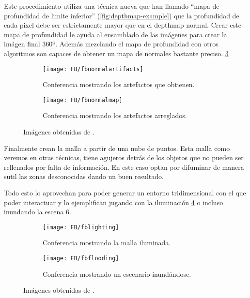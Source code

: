 Este procedimiento utiliza una técnica nueva que han llamado ``mapa de profundidad de limite inferior'' (\ref{fig:depthmap-example}) que la profundidad de cada pixel debe ser estrictamente mayor que en el depthmap normal. Crear este mapa de profundidad le ayuda al ensamblado de las imágenes para crear la imágen final 360º. Además mezclando el mapa de profundidad con otros algoritmos son capaces de obtener un mapa de normales bastante preciso. \ref{fig:fbnormalmapcorrected-example}

\begin{figure}[H]
\centering
\begin{subfigure}{.47\linewidth}
	\centering
	\texttt{[image: FB/fbnormalartifacts]}
  \caption{Conferencia mostrando los artefactos que obtienen.}
  \label{fig:fbnormalmapartifacts-example}
\end{subfigure}%
\hspace{.05\linewidth}
\begin{subfigure}{.47\linewidth}
	\centering
	\texttt{[image: FB/fbnormalmap]}
  \caption{Conferencia mostrando los artefactos arreglados.}
  \label{fig:fbnormalmapcorrected-example}
\end{subfigure}
\caption{Imágenes obtenidas de \cite{FBCasual3DCapture}.}
\end{figure}
\FloatBarrier


Finalmente crean la malla a partir de una nube de puntos. Esta malla como veremos en otras técnicas, tiene agujeros detrás de los objetos que no pueden ser rellenados por falta de información. En este caso optan por difuminar de manera sutil las zonas desconocidas dando un buen resultado.

Todo esto lo aprovechan para poder generar un entorno tridimensional con el que poder interactuar y lo ejemplifican jugando con la iluminación \ref{fig:fblighting-example} o incluso inundando la escena \ref{fig:fbflooding-example}.

\begin{figure}[H]
\centering
\begin{subfigure}{.47\linewidth}
	\centering
	\texttt{[image: FB/fblighting]}
  \caption{Conferencia mostrando la malla iluminada.}
  \label{fig:fblighting-example}
\end{subfigure}%
\hspace{.05\linewidth}
\begin{subfigure}{.47\linewidth}
	\centering
	\texttt{[image: FB/fbflooding]}
  \caption{Conferencia mostrando un escenario inundándose.}
  \label{fig:fbflooding-example}
\end{subfigure}
\caption{Imágenes obtenidas de \cite{FBCasual3DCapture}.}
\end{figure}
\FloatBarrier

